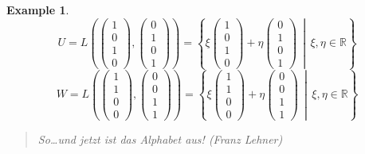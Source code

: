 \documentclass[a4paper,landscape,twocolumn]{article}
\newcommand\setdef[2]{\left\{#1\,\middle|\,#2\right\}}
\newtheorem{ex}{Example}[section]
\begin{document}
\begin{ex}
  \[ U = L\left(\begin{pmatrix} 1 \\ 0 \\ 1 \\ 0 \end{pmatrix}, \begin{pmatrix} 0 \\ 1 \\ 0 \\ 1 \end{pmatrix}\right) = \setdef{\xi \begin{pmatrix} 1 \\ 0 \\ 1 \\ 0 \end{pmatrix} + \eta \begin{pmatrix} 0 \\ 1 \\ 0 \\ 1 \end{pmatrix}}{\xi, \eta \in \mathbb R} \]
  \[ W = L\left(\begin{pmatrix} 1 \\ 1 \\ 0 \\ 0 \end{pmatrix}, \begin{pmatrix} 0 \\ 0 \\ 1 \\ 1 \end{pmatrix}\right) = \setdef{\xi \begin{pmatrix} 1 \\ 1 \\ 0 \\ 0 \end{pmatrix} + \eta \begin{pmatrix} 0 \\ 0 \\ 1 \\ 1 \end{pmatrix}}{\xi, \eta \in \mathbb R} \]

  \begin{quote}
    \foreignlanguage{ngerman}{So\dots und jetzt ist das Alphabet aus! (Franz Lehner)}
  \end{quote}


\end{ex}
\end{document}
